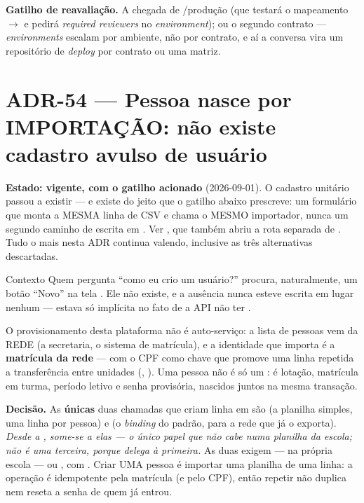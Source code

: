 \textbf{Gatilho de reavaliação.} A chegada de /produção (que testará o
mapeamento  \(\to\)  e pedirá \emph{required reviewers} no
\emph{environment}); ou o segundo contrato --- \emph{environments} escalam por
ambiente, não por contrato, e aí a conversa vira um repositório de
\emph{deploy} por contrato ou uma matriz.

\section{ADR-54 --- Pessoa nasce por IMPORTAÇÃO: não existe cadastro avulso de
usuário}
\label{adr:sem-cadastro-avulso}

\textbf{Estado: vigente, com o gatilho acionado} (2026-09-01). O cadastro
unitário passou a existir --- e existe do jeito que o gatilho abaixo prescreve:
um formulário que monta a MESMA linha de CSV e chama o MESMO importador, nunca
um segundo caminho de escrita em . Ver , que também
abriu a rota separada de . Tudo o mais nesta ADR continua
valendo, inclusive as três alternativas descartadas.

\begin{especificacao}{Contexto}
Quem pergunta \enquote{como eu crio um usuário?} procura, naturalmente, um botão
\enquote{Novo} na tela . Ele não existe, e a ausência
nunca esteve escrita em lugar nenhum --- estava só implícita no fato de a API
não ter .

O provisionamento desta plataforma não é auto-serviço: a lista de pessoas vem da
REDE (a secretaria, o sistema de matrícula), e a identidade que importa é a
\textbf{matrícula da rede} --- com o CPF como chave que promove uma linha
repetida a transferência entre unidades (, ). Uma
pessoa não é só um : é lotação, matrícula em turma, período letivo e
senha provisória, nascidos juntos na mesma transação.
\end{especificacao}

\textbf{Decisão.} As \textbf{únicas} duas chamadas que criam linha em
 são  (a planilha simples, uma linha
por pessoa) e  (o \emph{binding} do
padrão, para a rede que já o exporta). \emph{Desde a , some-se a
elas  --- o único papel que não cabe numa
planilha da escola;  não é uma terceira, porque delega à
primeira.} As duas exigem  --- na própria
escola --- ou , com . Criar UMA pessoa é
importar uma planilha de uma linha: a operação é idempotente pela matrícula (e
pelo CPF), então repetir não duplica nem reseta a senha de quem já entrou.

